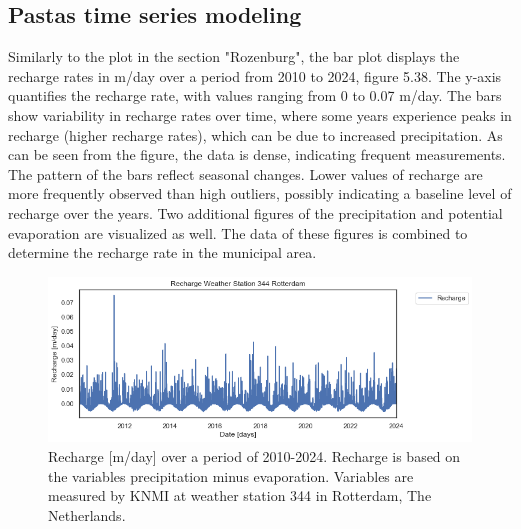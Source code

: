 \subsection{Pastas time series modeling}
Similarly to the plot in the section "Rozenburg", the bar plot displays the recharge rates in m/day over a period from 2010 to 2024, figure 5.38. The y-axis quantifies the recharge rate, with values ranging from 0 to 0.07 m/day. The bars show variability in recharge rates over time, where some years experience peaks in recharge (higher recharge rates), which can be due to increased precipitation. As can be seen from the figure, the data is dense, indicating frequent measurements. The pattern of the bars reflect seasonal changes. Lower values of recharge are more frequently observed than high outliers, possibly indicating a baseline level of recharge over the years. Two additional figures of the precipitation and potential evaporation are visualized as well. The data of these figures is combined to determine the recharge rate in the municipal area. 

\begin{figure}[htbp]
    \centering
    \includegraphics[width=0.75\linewidth]{figures/res heij/Recharge Rdam.png}
    \caption{Recharge [m/day] over a period of 2010-2024. Recharge is based on the variables precipitation minus evaporation. Variables are  measured by KNMI at weather station 344 in Rotterdam, The Netherlands.}
\end{figure} 

